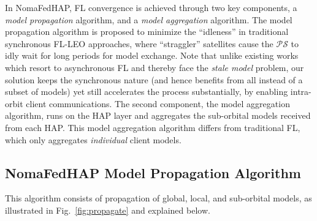 \documentclass[letter,journal]{IEEEtran}
\newcommand{\fref}[1]{Fig.~\ref{#1}}
\begin{document}
In NomaFedHAP, FL convergence is achieved through two key components, a {\em model propagation} algorithm, and a {\em model aggregation} algorithm. The model propagation algorithm is proposed to minimize the ``idleness'' in traditional synchronous FL-LEO approaches, where ``straggler'' satellites cause the $\mathcal{PS}$ to idly wait for long periods for model exchange. Note that unlike existing works which resort to asynchronous FL and thereby face the {\em stale model} problem, our solution keeps the synchronous nature (and hence benefits from all instead of a subset of models) yet still accelerates the process substantially, by enabling intra-orbit client communications.
The second component, the model aggregation algorithm, runs on the HAP layer and aggregates the sub-orbital models received from each HAP. This model aggregation algorithm differs from traditional FL, which only aggregates {\em individual} client models.
\subsection{NomaFedHAP Model Propagation Algorithm}\label{Model_propagation}

This algorithm consists of propagation of global, local, and sub-orbital models, as illustrated in \fref{fig:propagate} and explained below.
\end{document}
